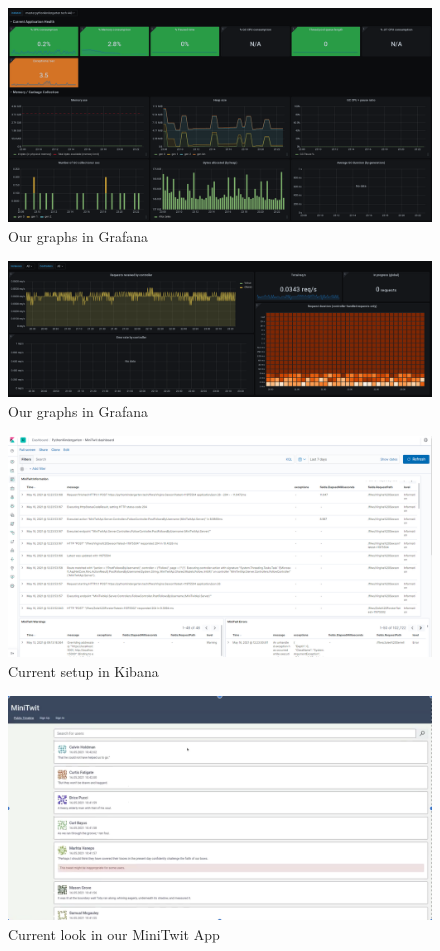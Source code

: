 \documentclass{article}
\begin{document}
\begin{figure}[h!]
    \centering
    \includegraphics[scale=0.2]{images/grafana_1.png}
    \caption{ Our graphs in Grafana }
\end{figure}

\begin{figure}[h!]
    \centering
    \includegraphics[scale=0.2]{images/grafana_2.png}
    \caption{ Our graphs in Grafana }
\end{figure}

\begin{figure}[h!]
    \centering
    \includegraphics[scale=0.2]{images/kibana_1.png}
    \caption{ Current setup in Kibana }
\end{figure}

\begin{figure}[h!]
    \centering
    \includegraphics[scale=0.2]{images/minitwit.png}
    \caption{ Current look in our MiniTwit App }
\end{figure}
\end{document}
